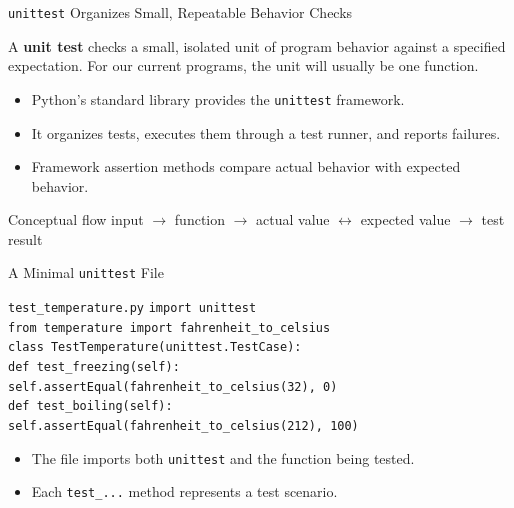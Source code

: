 \documentclass[aspectratio=169,10pt]{beamer}
\begin{document}

\begin{frame}{\texttt{unittest} Organizes Small, Repeatable Behavior Checks}
  \begin{cpdefinition}
    A \textbf{unit test} checks a small, isolated unit of program behavior against a specified expectation. For our current programs, the unit will usually be one function.
  \end{cpdefinition}

  \begin{itemize}
    \item Python's standard library provides the \texttt{unittest} framework.
    \item It organizes tests, executes them through a test runner, and reports failures.
    \item Framework assertion methods compare actual behavior with expected behavior.
  \end{itemize}

  \begin{block}{Conceptual flow}
    \centering
    input $\rightarrow$ function $\rightarrow$ actual value $\leftrightarrow$ expected value $\rightarrow$ test result
  \end{block}
\end{frame}

\begin{frame}[shrink=3]{A Minimal \texttt{unittest} File}
  \begin{block}{\texttt{test\_temperature.py}}
    \texttt{import unittest}\\
    \texttt{from temperature import fahrenheit\_to\_celsius}\\[0.08in]
    \texttt{class TestTemperature(unittest.TestCase):}\\
    \hspace*{0.20in}\texttt{def test\_freezing(self):}\\
    \hspace*{0.40in}\texttt{self.assertEqual(fahrenheit\_to\_celsius(32), 0)}\\[0.05in]
    \hspace*{0.20in}\texttt{def test\_boiling(self):}\\
    \hspace*{0.40in}\texttt{self.assertEqual(fahrenheit\_to\_celsius(212), 100)}
  \end{block}

  \begin{itemize}
    \item The file imports both \texttt{unittest} and the function being tested.
    \item Each \texttt{test\_...} method represents a test scenario.
  \end{itemize}
\end{frame}
\end{document}
